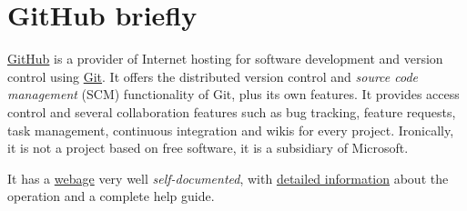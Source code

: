 \section{\textsf{GitHub} briefly}

\href{https://github.com/}{\textsf{GitHub}} is a provider of Internet hosting for software development and version control using \href{https://git-scm.com/}{Git}. It offers the distributed version control and \textit{source code management} (SCM) functionality of Git, plus its own features. It provides access control and several collaboration features such as bug tracking, feature requests, task management, continuous integration and wikis for every project. Ironically, it is not a project based on free software, it is a subsidiary of \textsf{Microsoft}.

It has a \href{https://docs.github.com/en}{webage} very well \textit{self-documented}, with \href{https://docs.github.com/en/github}{detailed information} about the operation and a complete help guide.


